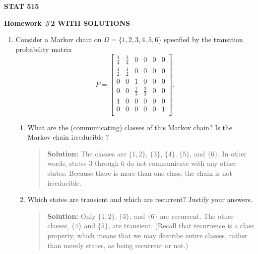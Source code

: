 \documentclass{article}
\begin{document}
\begin{center}
{\bf STAT 515}

{\bf Homework \#2 WITH SOLUTIONS}
\end{center}


\begin{enumerate}

  \item\label{midtermprob} 
  Consider a Markov chain on $\Omega=\{1, 2, 3, 4, 5, 6\}$ specified by the
  transition probability matrix\\
  \begin{equation*}
    P=
    \begin{bmatrix}
      \frac{1}{4} & \frac{3}{4}   & 0  & 0 & 0 & 0\\
      \frac{1}{2} & \frac{1}{2}   & 0  & 0 & 0 & 0\\
       0 & 0  & 1  & 0 & 0 & 0\\
       0 & 0   & \frac{1}{3}  & \frac{2}{3} & 0 & 0\\
       1 & 0 & 0 & 0 & 0 & 0 \\
       0 & 0   & 0  & 0 & 0 & 1\\
    \end{bmatrix}.
  \end{equation*}
  \begin{enumerate}
    
    \item What are the (communicating) classes of this Markov chain? Is the
    Markov chain irreducible ?
    \begin{quotation}{\bf Solution:}
    The classes are $\{1, 2\}$, $\{3\}$, $\{4\}$, $\{5\}$, and $\{6\}$.  In other words, states 3 through
    6 do not communicate with any other states.  Because there is more than one class, 
    the chain is not irreducible.
    \end{quotation}
    \item Which states are transient and which are recurrent? Justify your
    answers.
    \begin{quotation}{\bf Solution:}
    Only $\{1, 2\}$, $\{3\}$, and $\{6\}$ are recurrent.  The other classes,
    $\{4\}$ and $\{5\}$, are transient.  (Recall that recurrence is a class property,
    which means that we may describe entire classes, rather than merely states, 
    as being recurrent or not.)
    \end{quotation}
    

\end{enumerate}
\end{enumerate}
\end{document}
